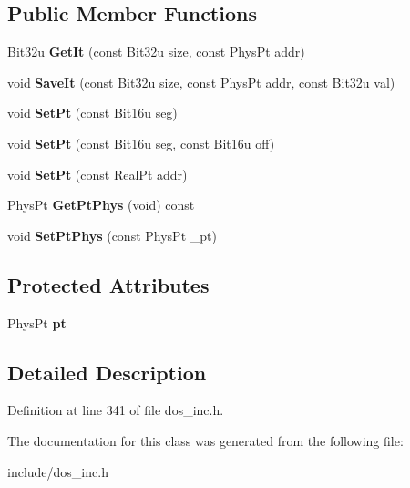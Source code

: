 \subsection*{Public Member Functions}
\begin{DoxyCompactItemize}
\item 
\hypertarget{classMemStruct_afa4f8877310aae5a757f4a30849a8f2d}{Bit32u {\bfseries Get\-It} (const Bit32u size, const Phys\-Pt addr)}\label{classMemStruct_afa4f8877310aae5a757f4a30849a8f2d}

\item 
\hypertarget{classMemStruct_a08aec3ad8437348b1f0c10c75c0e2e88}{void {\bfseries Save\-It} (const Bit32u size, const Phys\-Pt addr, const Bit32u val)}\label{classMemStruct_a08aec3ad8437348b1f0c10c75c0e2e88}

\item 
\hypertarget{classMemStruct_ae25851c2bd89342f26deba24e6e4fb5a}{void {\bfseries Set\-Pt} (const Bit16u seg)}\label{classMemStruct_ae25851c2bd89342f26deba24e6e4fb5a}

\item 
\hypertarget{classMemStruct_a67b18fbe231d442bd3b1ea904790ff14}{void {\bfseries Set\-Pt} (const Bit16u seg, const Bit16u off)}\label{classMemStruct_a67b18fbe231d442bd3b1ea904790ff14}

\item 
\hypertarget{classMemStruct_a56f200b767f2093bc73c55ca1e3a1e91}{void {\bfseries Set\-Pt} (const Real\-Pt addr)}\label{classMemStruct_a56f200b767f2093bc73c55ca1e3a1e91}

\item 
\hypertarget{classMemStruct_ac95ec2acc379f1f7ce1e46683e8109b2}{Phys\-Pt {\bfseries Get\-Pt\-Phys} (void) const }\label{classMemStruct_ac95ec2acc379f1f7ce1e46683e8109b2}

\item 
\hypertarget{classMemStruct_a89dcb5f72ec074234fd8045b0ccd05f0}{void {\bfseries Set\-Pt\-Phys} (const Phys\-Pt \-\_\-pt)}\label{classMemStruct_a89dcb5f72ec074234fd8045b0ccd05f0}

\end{DoxyCompactItemize}
\subsection*{Protected Attributes}
\begin{DoxyCompactItemize}
\item 
\hypertarget{classMemStruct_acac6123c566805e45fb8ff9e7744d3e2}{Phys\-Pt {\bfseries pt}}\label{classMemStruct_acac6123c566805e45fb8ff9e7744d3e2}

\end{DoxyCompactItemize}


\subsection{Detailed Description}


Definition at line 341 of file dos\-\_\-inc.\-h.



The documentation for this class was generated from the following file\-:\begin{DoxyCompactItemize}
\item 
include/dos\-\_\-inc.\-h\end{DoxyCompactItemize}
